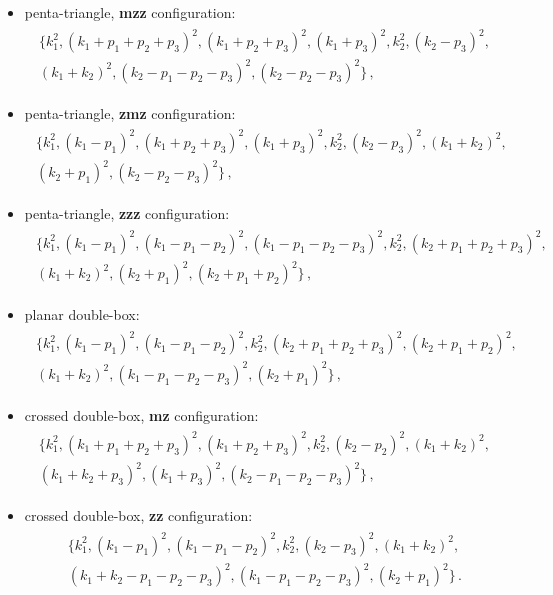 \begin{itemize}
	\item penta-triangle, \textbf{mzz} configuration:
		\begin{align} \begin{aligned}
			\big\{k_1^2,(k_1+p_1+p_2+p_3)^2,(k_1+p_2+p_3)^2,(k_1+p_3)^2,k_2^2,(k_2-p_3)^2,\\(k_1+k_2)^2,(k_2-p_1-p_2-p_3)^2,(k_2-p_2-p_3)^2\big\} \,,
		\end{aligned} \end{align}
	\item penta-triangle, \textbf{zmz} configuration:
		\begin{align} \begin{aligned}
		\big\{k_1^2,(k_1-p_1)^2,(k_1+p_2+p_3)^2,(k_1+p_3)^2,k_2^2,(k_2-p_3)^2,(k_1+k_2)^2,\\(k_2+p_1)^2,(k_2-p_2-p_3)^2 \big\} \,,
		\end{aligned} \end{align}
	\item penta-triangle, \textbf{zzz} configuration:
		\begin{align} \begin{aligned}
			\big\{k_1^2,(k_1-p_1)^2,(k_1-p_1-p_2)^2,(k_1-p_1-p_2-p_3)^2,k_2^2,(k_2+p_1+p_2+p_3)^2, \\ (k_1+k_2)^2,(k_2+p_1)^2,(k_2+p_1+p_2)^2\big\} \,,
		\end{aligned} \end{align}
	\item planar double-box:
		\begin{align} \begin{aligned}
			\big\{k_1^2,(k_1-p_1)^2,(k_1-p_1-p_2)^2,k_2^2,(k_2+p_1+p_2+p_3)^2,(k_2+p_1+p_2)^2, \\ (k_1+k_2)^2,(k_1-p_1-p_2-p_3)^2,(k_2+p_1)^2\big\} \,,
		\end{aligned} \end{align}
	\item crossed double-box, \textbf{mz} configuration:
		\begin{align} \begin{aligned}
			\big\{k_1^2,(k_1+p_1+p_2+p_3)^2,(k_1+p_2+p_3)^2,k_2^2,(k_2-p_2)^2,(k_1+k_2)^2,\\ (k_1+k_2+p_3)^2,(k_1+p_3)^2,(k_2-p_1-p_2-p_3)^2\big\} \,,
		\end{aligned} \end{align}
	\item crossed double-box, \textbf{zz} configuration:
		\begin{align} \begin{aligned}
			\big\{k_1^2,(k_1-p_1)^2,(k_1-p_1-p_2)^2,k_2^2,(k_2-p_3)^2,(k_1+k_2)^2, \\ (k_1+k_2-p_1-p_2-p_3)^2,(k_1-p_1-p_2-p_3)^2,(k_2+p_1)^2\big\} \,.
		\end{aligned} \end{align}
\end{itemize}
